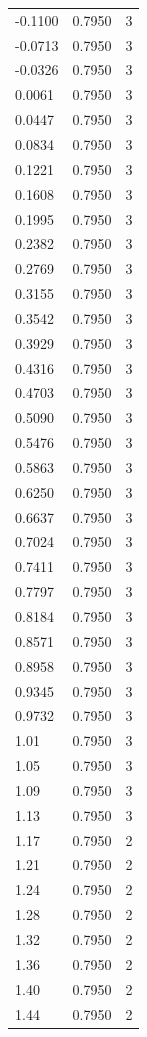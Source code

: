 \begin{longtable}{lrr}
  -0.1100 & 0.7950 & 3 \\
  -0.0713 & 0.7950 & 3 \\
  -0.0326 & 0.7950 & 3 \\
  0.0061 & 0.7950 & 3 \\
  0.0447 & 0.7950 & 3 \\
  0.0834 & 0.7950 & 3 \\
  0.1221 & 0.7950 & 3 \\
  0.1608 & 0.7950 & 3 \\
  0.1995 & 0.7950 & 3 \\
  0.2382 & 0.7950 & 3 \\
  0.2769 & 0.7950 & 3 \\
  0.3155 & 0.7950 & 3 \\
  0.3542 & 0.7950 & 3 \\
  0.3929 & 0.7950 & 3 \\
  0.4316 & 0.7950 & 3 \\
  0.4703 & 0.7950 & 3 \\
  0.5090 & 0.7950 & 3 \\
  0.5476 & 0.7950 & 3 \\
  0.5863 & 0.7950 & 3 \\
  0.6250 & 0.7950 & 3 \\
  0.6637 & 0.7950 & 3 \\
  0.7024 & 0.7950 & 3 \\
  0.7411 & 0.7950 & 3 \\
  0.7797 & 0.7950 & 3 \\
  0.8184 & 0.7950 & 3 \\
  0.8571 & 0.7950 & 3 \\
  0.8958 & 0.7950 & 3 \\
  0.9345 & 0.7950 & 3 \\
  0.9732 & 0.7950 & 3 \\
  1.01 & 0.7950 & 3 \\
  1.05 & 0.7950 & 3 \\
  1.09 & 0.7950 & 3 \\
  1.13 & 0.7950 & 3 \\
  1.17 & 0.7950 & 2 \\
  1.21 & 0.7950 & 2 \\
  1.24 & 0.7950 & 2 \\
  1.28 & 0.7950 & 2 \\
  1.32 & 0.7950 & 2 \\
  1.36 & 0.7950 & 2 \\
  1.40 & 0.7950 & 2 \\
  1.44 & 0.7950 & 2 \\

\end{longtable}
